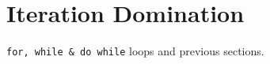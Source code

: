 \documentclass[../../Problems]{subfiles}
\begin{document}
\section{Iteration Domination}
\begin{topics}
\verb!for, while & do while! loops and previous sections.
\end{topics}





\end{document}
